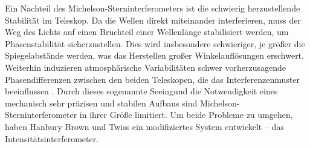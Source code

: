 Ein Nachteil des Michelson-Sterninterferometers ist die schwierig herzustellende Stabilität im Teleskop. 
Da die Wellen direkt miteinander interferieren, muss der Weg des Lichts auf einen Bruchteil einer Wellenlänge stabilisiert werden, um Phasenstabilität sicherzustellen. 
Dies wird insbesondere schwieriger, je größer die Spiegelabstände werden, was das Herstellen großer Winkelauflösungen erschwert. 
Weiterhin induzieren atmosphärische Variabilitäten schwer vorherzusagende Phasendifferenzen zwischen den beiden Teleskopen, die das Interferenzenmuster beeinflussen \cite[Kap. 2]{brownIntensityInterferometerIts1974}. 
Durch dieses sogenannte \glqq Seeing\grqq\;und die Notwendigkeit eines mechanisch sehr präzisen und stabilen Aufbaus sind Michelson-Sterninterferometer in ihrer Größe limitiert. 
Um beide Probleme zu umgehen, haben Hanbury Brown und Twiss ein modifiziertes System entwickelt -- das Intensitätsinterferometer.

